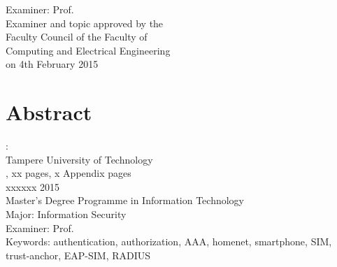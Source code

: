 \documentclass[12pt,a4paper,english]{tutthesis}
\begin{document}
\begin{flushright}  
  \begin{minipage}[c]{6.8cm}
    \begin{spacing}{1.0}
      \textsf{Examiner: Prof. \@examiner}\\
      \textsf{Examiner and topic approved by the}\\ 
      \textsf{Faculty Council of the Faculty of} \\
      \textsf{Computing and Electrical Engineering} \\
      \textsf{on 4th February 2015}\\
    \end{spacing}
  \end{minipage}
\end{flushright}


\if@twoside
\clearpage
\fi


\setcounter{page}{0} %

\chapter*{Abstract}

\begin{spacing}{1.0}
  {\bf \textsf{\MakeUppercase{\@author}}}: \@title\\   %
   \textsf{Tampere University of Technology}\\
   \textsf{\@thesistype, xx pages, x Appendix pages} \\
   \textsf{xxxxxx 2015}\\
   \textsf{Master's Degree Programme in Information Technology}\\
   \textsf{Major: Information Security}\\
   \textsf{Examiner: Prof. \@examiner}\\ %
   \textsf{Keywords: authentication, authorization, AAA, homenet, smartphone, SIM, trust-anchor, EAP-SIM, RADIUS}\\
\end{spacing}
\end{document}
